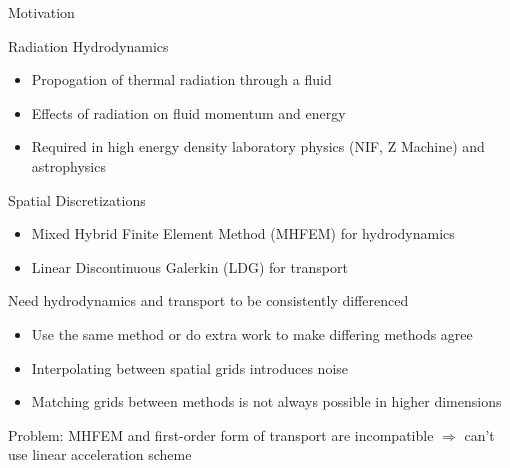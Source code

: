 \documentclass[10pt]{beamer}
\begin{document}
\begin{frame}{Motivation}

	\scriptsize
	Radiation Hydrodynamics 
	\vspace{-.05in}
	    \begin{itemize}
            \item Propogation of thermal radiation through a fluid
            \item Effects of radiation on fluid momentum and energy 
	    	\item Required in high energy density laboratory physics (NIF, Z Machine) and astrophysics 
	    \end{itemize}


    Spatial Discretizations
    \vspace{-.05in}
    \begin{itemize}
        \item Mixed Hybrid Finite Element Method (MHFEM) for hydrodynamics 
        \item Linear Discontinuous Galerkin (LDG) for transport 
    \end{itemize}

    Need hydrodynamics and transport to be consistently differenced  
    \vspace{-.05in}
    \begin{itemize}
    	\item Use the same method or do extra work to make differing methods agree 
        \item Interpolating between spatial grids introduces noise 
        \item Matching grids between methods is not always possible in higher dimensions 
    \end{itemize}


    Problem: MHFEM and first-order form of transport are incompatible $\Rightarrow$ can't use linear acceleration scheme 


\end{frame}
\end{document}
